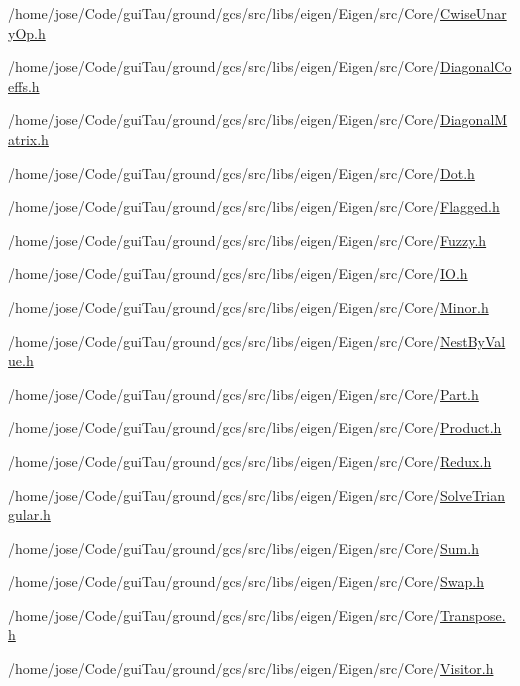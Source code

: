 \begin{DoxyCompactItemize}
/home/jose/\-Code/gui\-Tau/ground/gcs/src/libs/eigen/\-Eigen/src/\-Core/\hyperlink{_cwise_unary_op_8h}{Cwise\-Unary\-Op.\-h}\item 
/home/jose/\-Code/gui\-Tau/ground/gcs/src/libs/eigen/\-Eigen/src/\-Core/\hyperlink{_diagonal_coeffs_8h}{Diagonal\-Coeffs.\-h}\item 
/home/jose/\-Code/gui\-Tau/ground/gcs/src/libs/eigen/\-Eigen/src/\-Core/\hyperlink{_diagonal_matrix_8h}{Diagonal\-Matrix.\-h}\item 
/home/jose/\-Code/gui\-Tau/ground/gcs/src/libs/eigen/\-Eigen/src/\-Core/\hyperlink{_dot_8h}{Dot.\-h}\item 
/home/jose/\-Code/gui\-Tau/ground/gcs/src/libs/eigen/\-Eigen/src/\-Core/\hyperlink{_flagged_8h}{Flagged.\-h}\item 
/home/jose/\-Code/gui\-Tau/ground/gcs/src/libs/eigen/\-Eigen/src/\-Core/\hyperlink{_fuzzy_8h}{Fuzzy.\-h}\item 
/home/jose/\-Code/gui\-Tau/ground/gcs/src/libs/eigen/\-Eigen/src/\-Core/\hyperlink{_i_o_8h}{I\-O.\-h}\item 
/home/jose/\-Code/gui\-Tau/ground/gcs/src/libs/eigen/\-Eigen/src/\-Core/\hyperlink{_minor_8h}{Minor.\-h}\item 
/home/jose/\-Code/gui\-Tau/ground/gcs/src/libs/eigen/\-Eigen/src/\-Core/\hyperlink{_nest_by_value_8h}{Nest\-By\-Value.\-h}\item 
/home/jose/\-Code/gui\-Tau/ground/gcs/src/libs/eigen/\-Eigen/src/\-Core/\hyperlink{_part_8h}{Part.\-h}\item 
/home/jose/\-Code/gui\-Tau/ground/gcs/src/libs/eigen/\-Eigen/src/\-Core/\hyperlink{_product_8h}{Product.\-h}\item 
/home/jose/\-Code/gui\-Tau/ground/gcs/src/libs/eigen/\-Eigen/src/\-Core/\hyperlink{_redux_8h}{Redux.\-h}\item 
/home/jose/\-Code/gui\-Tau/ground/gcs/src/libs/eigen/\-Eigen/src/\-Core/\hyperlink{_solve_triangular_8h}{Solve\-Triangular.\-h}\item 
/home/jose/\-Code/gui\-Tau/ground/gcs/src/libs/eigen/\-Eigen/src/\-Core/\hyperlink{_sum_8h}{Sum.\-h}\item 
/home/jose/\-Code/gui\-Tau/ground/gcs/src/libs/eigen/\-Eigen/src/\-Core/\hyperlink{_swap_8h}{Swap.\-h}\item 
/home/jose/\-Code/gui\-Tau/ground/gcs/src/libs/eigen/\-Eigen/src/\-Core/\hyperlink{_transpose_8h}{Transpose.\-h}\item 
/home/jose/\-Code/gui\-Tau/ground/gcs/src/libs/eigen/\-Eigen/src/\-Core/\hyperlink{_visitor_8h}{Visitor.\-h}\item 

\end{DoxyCompactItemize}
